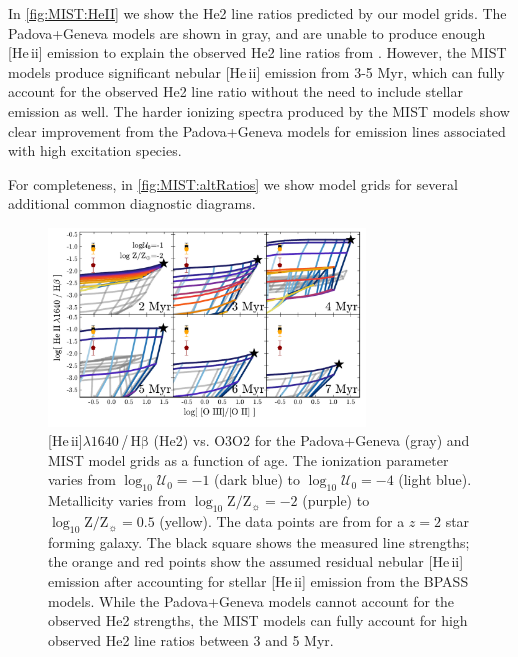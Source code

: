 \documentclass[linenumbers, trackchanges, tighten]{aastex61}%
\newcommand{\Fig}[1]{\autoref{fig:#1}}
\newcommand{\logten}{\ensuremath{\log_{10}}}
\newcommand{\heii}{[He\,{\sc ii}]\xspace}
\newcommand{\hb}{\ensuremath{\mathrm{H\beta}}}
\newcommand\lam[1]{\ensuremath{\lambda #1}}
\newcommand{\logZeq}[1]{\ensuremath{\logten \mathrm{Z}/\mathrm{Z}_{\sun} = #1}}
\newcommand{\logU}{\ensuremath{\logten \mathcal{U}_0}}
\begin{document}
In \Fig{MIST:HeII} we show the He2 line ratios predicted by our model grids. The Padova+Geneva models are shown in gray, and are unable to produce enough \heii emission to explain the observed He2 line ratios from \citet{Steidel16}. However, the MIST models produce significant nebular \heii emission from 3-5 Myr, which can fully account for the observed He2 line ratio without the need to include stellar emission as well. The harder ionizing spectra produced by the MIST models show clear improvement from the Padova+Geneva models for emission lines associated with high excitation species.

For completeness, in \Fig{MIST:altRatios} we show model grids for several additional common diagnostic diagrams. 
\begin{figure}[!htbp]
  \begin{centering}
    \includegraphics[width=0.75\textwidth]{f25.pdf}
    \caption{\heii\lam{1640}\,/\,\hb{} (He2) vs. O3O2 for the Padova+Geneva (gray) and MIST model grids as a function of age. The ionization parameter varies from $\logU{}=-1$ (dark blue) to $\logU{}=-4$ (light blue). Metallicity varies from \logZeq{-2} (purple) to \logZeq{0.5} (yellow). The data points are from \citet{Steidel16} for a $z=2$ star forming galaxy. The black square shows the measured line strengths; the orange and red points show the assumed residual nebular \heii{} emission after accounting for stellar \heii{} emission from the BPASS models. While the Padova+Geneva models cannot account for the observed He2 strengths, the MIST models can fully account for high observed He2 line ratios between 3 and 5 Myr.}
    \label{fig:MIST:HeII}
  \end{centering}
\end{figure}
\end{document}
